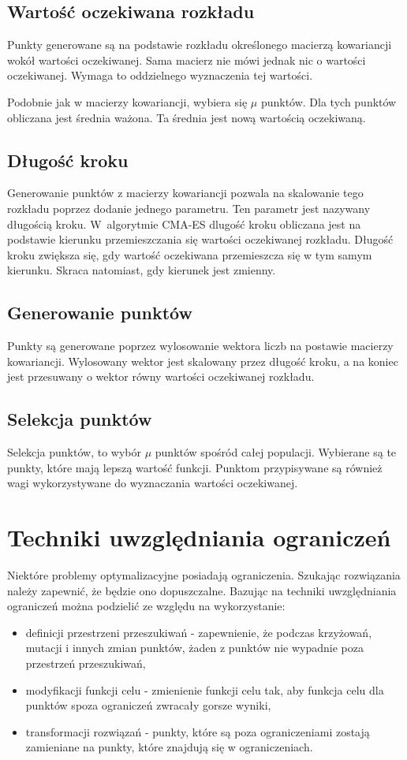 \documentclass{mini}
\begin{document}
\subsection{Wartość oczekiwana rozkładu}
Punkty generowane są na podstawie rozkładu określonego macierzą kowariancji wokół wartości oczekiwanej. Sama macierz nie mówi jednak nic o wartości oczekiwanej. Wymaga to oddzielnego wyznaczenia tej wartości.

Podobnie jak w macierzy kowariancji, wybiera się $\mu$ punktów. Dla tych punktów obliczana jest średnia ważona. Ta średnia jest nową wartością oczekiwaną.

\subsection{Długość kroku}
Generowanie punktów z macierzy kowariancji pozwala na skalowanie tego rozkładu poprzez dodanie jednego parametru. Ten parametr jest nazywany długością kroku. W~algorytmie CMA-ES dlugość kroku obliczana jest na podstawie kierunku przemieszczania się wartości oczekiwanej rozkładu. Długość kroku zwiększa się, gdy wartość oczekiwana przemieszcza się w tym samym kierunku. Skraca natomiast, gdy kierunek jest zmienny.

\subsection{Generowanie punktów}
Punkty są generowane poprzez wylosowanie wektora liczb na postawie macierzy kowariancji. Wylosowany wektor jest skalowany przez długość kroku, a na koniec jest przesuwany o wektor równy wartości oczekiwanej rozkładu.

\subsection{Selekcja punktów}
Selekcja punktów, to wybór $\mu$ punktów spośród całej populacji. Wybierane są te punkty, które mają lepszą wartość funkcji. Punktom przypisywane są również wagi wykorzystywane do wyznaczania wartości oczekiwanej.

\pagebreak

\section{Techniki uwzględniania ograniczeń}
Niektóre problemy optymalizacyjne posiadają ograniczenia. Szukając rozwiązania należy zapewnić, że będzie ono dopuszczalne. Bazując na \cite{wyklady} techniki uwzględniania ograniczeń można podzielić ze względu na wykorzystanie:
\begin{itemize}[noitemsep]
\item definicji przestrzeni przeszukiwań - zapewnienie, że podczas krzyżowań, mutacji i innych zmian punktów, żaden z punktów nie wypadnie poza przestrzeń przeszukiwań,
\item modyfikacji funkcji celu - zmienienie funkcji celu tak, aby funkcja celu dla punktów spoza ograniczeń zwracały gorsze wyniki,
\item transformacji rozwiązań - punkty, które są poza ograniczeniami zostają zamieniane na punkty, które znajdują się w ograniczeniach.
\end{itemize}
\end{document}
